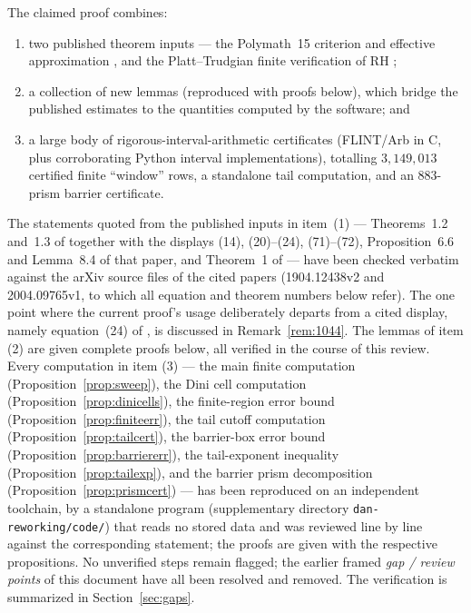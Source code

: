 \documentclass[11pt]{article}
\theoremstyle{definition}
\begin{document}
The claimed proof combines:
\begin{enumerate}
\item two published theorem inputs --- the Polymath~15 criterion and
effective approximation \cite{Polymath}, and the Platt--Trudgian finite
verification of RH \cite{PlattTrudgian};
\item a collection of new lemmas (reproduced with proofs below),
which bridge the published estimates to the quantities computed by
the software; and
\item a large body of rigorous-interval-arithmetic certificates
(FLINT/Arb in C, plus corroborating Python interval implementations),
totalling $3{,}149{,}013$ certified finite ``window'' rows, a
standalone tail computation, and an $883$-prism barrier certificate.
\end{enumerate}
The statements quoted from the published inputs in item~(1) ---
Theorems~1.2 and~1.3 of \cite{Polymath} together with the displays
(14), (20)--(24), (71)--(72), Proposition~6.6 and Lemma~8.4 of that
paper, and Theorem~1 of \cite{PlattTrudgian} --- have been checked
verbatim against the arXiv source files of the cited papers
(1904.12438v2 and 2004.09765v1, to which all equation and theorem
numbers below refer). The one point where the current proof's usage
deliberately departs from a cited display, namely equation~(24) of
\cite{Polymath}, is discussed in Remark~\ref{rem:1044}. The
lemmas of item (2) are given complete proofs below, all verified in
the course of this review. Every computation in item (3) --- the main
finite computation (Proposition~\ref{prop:sweep}), the Dini cell
computation (Proposition~\ref{prop:dinicells}), the finite-region
error bound (Proposition~\ref{prop:finiteerr}), the tail cutoff
computation (Proposition~\ref{prop:tailcert}), the barrier-box
error bound (Proposition~\ref{prop:barriererr}), the tail-exponent
inequality (Proposition~\ref{prop:tailexp}), and the barrier prism
decomposition (Proposition~\ref{prop:prismcert}) --- has been
reproduced on an independent toolchain, by a standalone program
(supplementary directory \texttt{dan-reworking/code/}) that reads no stored data
and was reviewed line by line against the corresponding statement;
the proofs are given with the respective propositions. No
unverified steps remain flagged; the earlier framed \emph{gap /
review points} of this document have all been resolved and
removed. The verification is summarized in
Section~\ref{sec:gaps}.

\end{document}
